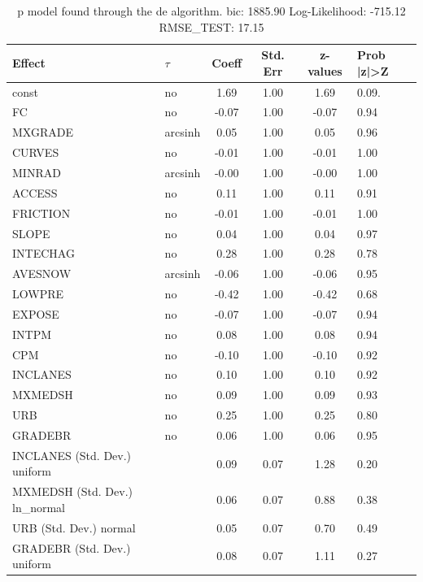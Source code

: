 \begin{table}
	\caption{p model found through the de algorithm. bic: 1885.90 Log-Likelihood: -715.12 RMSE_TEST: 17.15}
	\begin{center}
		\begin{tabular}{|l|l|c|c|c|l|}
			\hline
			Effect & $\tau$ & Coeff & Std. Err & z-values & Prob |z|>Z \\
			\hline
			const & no & 1.69 & 1.00 & 1.69 & 0.09. \\
			\hline
			FC & no & -0.07 & 1.00 & -0.07 & 0.94 \\
			\hline
			MXGRADE & arcsinh & 0.05 & 1.00 & 0.05 & 0.96 \\
			\hline
			CURVES & no & -0.01 & 1.00 & -0.01 & 1.00 \\
			\hline
			MINRAD & arcsinh & -0.00 & 1.00 & -0.00 & 1.00 \\
			\hline
			ACCESS & no & 0.11 & 1.00 & 0.11 & 0.91 \\
			\hline
			FRICTION & no & -0.01 & 1.00 & -0.01 & 1.00 \\
			\hline
			SLOPE & no & 0.04 & 1.00 & 0.04 & 0.97 \\
			\hline
			INTECHAG & no & 0.28 & 1.00 & 0.28 & 0.78 \\
			\hline
			AVESNOW & arcsinh & -0.06 & 1.00 & -0.06 & 0.95 \\
			\hline
			LOWPRE & no & -0.42 & 1.00 & -0.42 & 0.68 \\
			\hline
			EXPOSE & no & -0.07 & 1.00 & -0.07 & 0.94 \\
			\hline
			INTPM & no & 0.08 & 1.00 & 0.08 & 0.94 \\
			\hline
			CPM & no & -0.10 & 1.00 & -0.10 & 0.92 \\
			\hline
			INCLANES & no & 0.10 & 1.00 & 0.10 & 0.92 \\
			\hline
			MXMEDSH & no & 0.09 & 1.00 & 0.09 & 0.93 \\
			\hline
			URB & no & 0.25 & 1.00 & 0.25 & 0.80 \\
			\hline
			GRADEBR & no & 0.06 & 1.00 & 0.06 & 0.95 \\
			\hline
			INCLANES (Std. Dev.) uniform &  & 0.09 & 0.07 & 1.28 & 0.20 \\
			\hline
			MXMEDSH (Std. Dev.) ln_normal &  & 0.06 & 0.07 & 0.88 & 0.38 \\
			\hline
			URB (Std. Dev.) normal &  & 0.05 & 0.07 & 0.70 & 0.49 \\
			\hline
			GRADEBR (Std. Dev.) uniform &  & 0.08 & 0.07 & 1.11 & 0.27 \\
			\hline
		\end{tabular}
	\end{center}
\end{table}